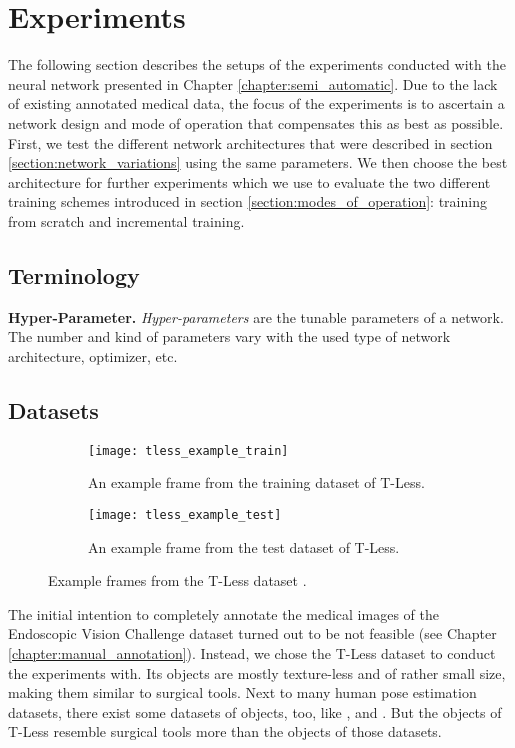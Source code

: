\chapter{Experiments} \label{chapter:experiments}

The following section describes the setups of the experiments conducted with the neural network presented in Chapter \ref{chapter:semi_automatic}. Due to the lack of existing annotated medical data, the focus of the experiments is to ascertain a network design and mode of operation that compensates this as best as possible. First, we test the different network architectures that were described in section \ref{section:network_variations} using the same parameters. We then choose the best architecture for further experiments which we use to evaluate the two different training schemes introduced in section \ref{section:modes_of_operation}: training from scratch and incremental training.

\section{Terminology}

\noindent\textbf{Hyper-Parameter.} \textit{Hyper-parameters} are the tunable parameters of a network. The number and kind of parameters vary with the used type of network architecture, optimizer, etc.

\section{Datasets}

\begin{figure}[!tbp]
	\centering
	\begin{subfigure}[t]{0.47\textwidth}
		\centering
    	\texttt{[image: tless\_example\_train]}
    	\caption{An example frame from the training dataset of T-Less.}
    	\label{fig:tless_example_train}
	\end{subfigure}
	\hfill
	\begin{subfigure}[t]{0.47\textwidth}
		\centering
    	\texttt{[image: tless\_example\_test]}
    	\caption{An example frame from the test dataset of T-Less.}
    	\label{fig:tless_example_test}
	\end{subfigure}
	\caption{Example frames from the T-Less dataset \cite{tless}.}
	\label{fig:tless_examples}
\end{figure}

The initial intention to completely annotate the medical images of the Endoscopic Vision Challenge dataset turned out to be not feasible (see Chapter \ref{chapter:manual_annotation}). Instead, we chose the T-Less dataset to conduct the experiments with. Its objects are mostly texture-less  and of rather small size, making them similar to surgical tools. Next to many human pose estimation datasets, there exist some datasets of objects, too, like \cite{next_view_dataset}, \cite{pracsys_dataset} and \cite{rigid_body_dataset}. But the objects of T-Less resemble surgical tools more than the objects of those datasets.

